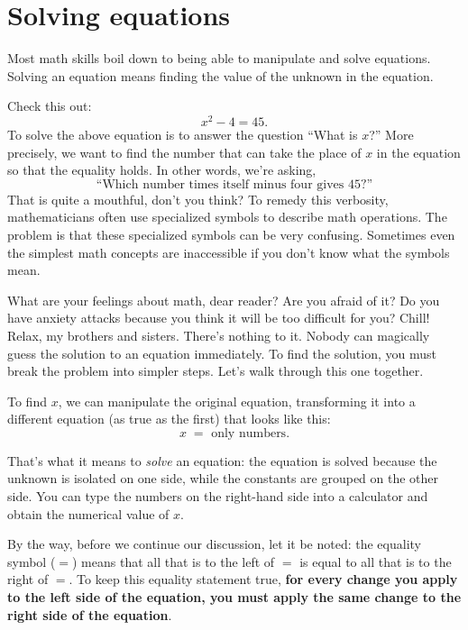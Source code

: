 
\section{Solving equations}
\label{sec:solving_equations}
	
	Most math skills boil down to being able to manipulate and solve equations.
	Solving an equation means finding the value of the unknown in the equation.  

	Check this  out:
	\[
	 x^2-4=45.
	\]
	To solve the above equation is to answer
	the question ``What is $x$?''
	More precisely, we want to find the number that can take the 
	place of $x$ in the equation so that the equality holds.
	In other words, we're asking,
	\[
	  \text{``Which number times itself minus four gives 45?''}
	\]
	That is quite a mouthful, don't you think? 
	To remedy this verbosity, mathematicians often use specialized symbols to describe math operations.
	The problem is that these specialized symbols can be very confusing. 
	Sometimes even the simplest math concepts are inaccessible if you don't know what the symbols mean. 

	What are your feelings about math, dear reader? Are you afraid of it? 
	Do you have anxiety attacks because you think it will be too difficult for you?
	Chill! Relax, my brothers and sisters. There's nothing to it.
	Nobody can magically guess the solution to an equation immediately.
	To find the solution, you must break the problem into simpler steps.
	Let's walk through this one together.

	To find $x$, we can manipulate the original equation, 
	transforming it into a different equation (as true as the first) that looks like this:
	\[
	  x \; = \textrm{ only numbers.}
	\]

	\noindent
	That's what it means to \emph{solve} an equation:
	the equation is solved because the unknown is isolated on one side,
	while the constants are grouped on the other side.
	You can type the numbers on the right-hand side into a calculator and obtain the numerical value of $x$.

	By the way, before we continue our discussion,
	let it be noted: the equality symbol ($=$) means that all that is to the left of $=$ 
	is equal to 
	all that is to the right of $=$. 
	To keep this equality statement true,  
	\textbf{for every change you apply to the left side of the equation, 
	you must apply the same change to the right side of the equation}.

